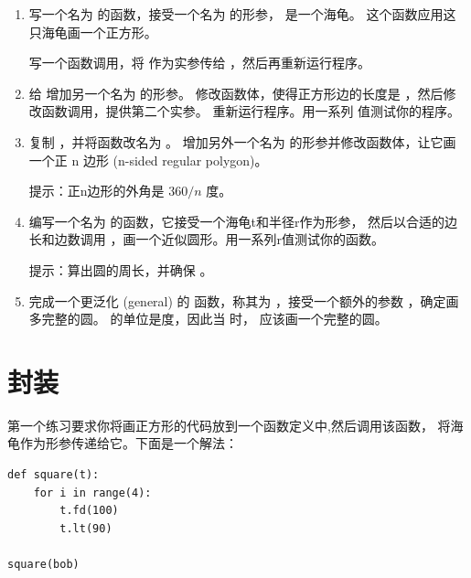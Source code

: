 \begin{enumerate}

\item 写一个名为  的函数，接受一个名为  的形参，  是一个海龟。 这个函数应用这只海龟画一个正方形。

写一个函数调用，将  作为实参传给  ，然后再重新运行程序。

\item 给  增加另一个名为  的形参。
 修改函数体，使得正方形边的长度是  ，然后修改函数调用，提供第二个实参。
 重新运行程序。用一系列  值测试你的程序。

\item 复制  ，并将函数改名为  。
   增加另外一个名为  的形参并修改函数体，让它画一个正 n 边形 (n-sided regular polygon)。

提示：正n边形的外角是 $360/n$ 度。

\item 编写一个名为  的函数，它接受一个海龟t和半径r作为形参， 然后以合适的边长和边数调用  ，画一个近似圆形。用一系列r值测试你的函数。

提示：算出圆的周长，并确保  。

\item 完成一个更泛化 (general) 的  函数，称其为  ，接受一个额外的参数  ，确定画多完整的圆。  的单位是度，因此当  时，  应该画一个完整的圆。

  

\end{enumerate}


\section{封装}


第一个练习要求你将画正方形的代码放到一个函数定义中,然后调用该函数，
将海龟作为形参传递给它。下面是一个解法：

\begin{lstlisting}
def square(t):
    for i in range(4):
        t.fd(100)
        t.lt(90)

square(bob)
\end{lstlisting}

